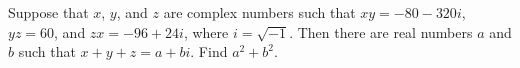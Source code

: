 Suppose that $x$, $y$, and $z$ are complex numbers such that $xy = -80-320i$, $yz =  60$, and $zx =  -96+24i$, where $i = \sqrt{-1}$. Then there are real numbers $a$ and $b$ such that $x+y+z = a+bi$. Find $a^2 + b^2$.